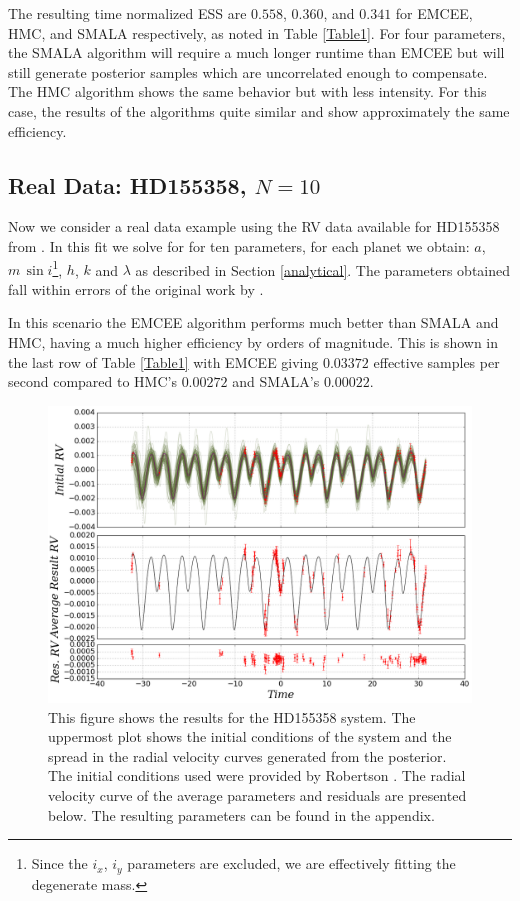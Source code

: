 \documentclass{aa}
\begin{document}
The resulting time normalized ESS are $0.558$, $0.360$, and $0.341$ for EMCEE, HMC, and SMALA respectively, as noted in Table \ref{Table1}. For four parameters, the SMALA algorithm will require a much longer runtime than EMCEE but will still generate posterior samples which are uncorrelated enough to compensate. The HMC algorithm shows the same behavior but with less intensity. For this case, the results of the algorithms quite similar and show approximately the same efficiency.


\subsection{Real Data: HD155358, $N=10$}

Now we consider a real data example using the RV data available for HD155358 from \cite{Robertson2012}. In this fit we solve for for ten parameters, for each planet we obtain: $a$, $m\, \sin i$\footnote{Since the $i_x$, $i_y$ parameters are excluded, we are effectively fitting the degenerate mass.}, $h$, $k$ and $\lambda$ as described in Section \ref{analytical}. The parameters obtained fall within errors of the original work by \cite{Robertson2012}.

In this scenario the EMCEE algorithm performs much better than SMALA and HMC, having a much higher efficiency by orders of magnitude. This is shown in the last row of Table \ref{Table1} with EMCEE giving $0.03372$ effective samples per second compared to HMC's $0.00272$ and SMALA's $0.00022$.

\begin{figure}
\centering
\includegraphics[width=0.95\hsize]{rv3-1.png}
   \caption{This figure shows the results for the HD155358 system. The uppermost plot shows the initial conditions of the system and the spread in the radial velocity curves generated from the posterior. The initial conditions used were provided by Robertson \cite{Robertson2012}. The radial velocity curve of the average parameters and residuals are presented below. The resulting parameters can be found in the appendix.}
      \label{FigHD}
\end{figure}
\end{document}
